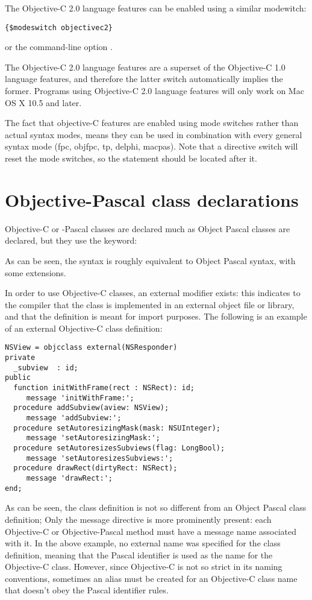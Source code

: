 The Objective-C 2.0 language features can be enabled using a similar
modewitch:
\begin{verbatim}
{$modeswitch objectivec2}
\end{verbatim}
or the command-line option .

The Objective-C 2.0 language features are a superset of the Objective-C 1.0
language features, and therefore the latter switch automatically implies the
former. Programs using Objective-C 2.0 language features will only work on
Mac OS X 10.5 and later.

The fact that objective-C features are enabled using mode switches rather than
actual syntax modes, means they can be used in combination with every general
syntax mode (fpc, objfpc, tp, delphi, macpas). Note that a 
directive switch will reset the mode switches, so the 
statement should be located after it.

\section{Objective-Pascal class declarations}
Objective-C or -Pascal classes are declared much as Object Pascal classes are
declared, but they use the  keyword:

As can be seen, the syntax is roughly equivalent to Object Pascal syntax, with some
extensions.

In order to use Objective-C classes, an external modifier exists: this
indicates to the compiler that the class is implemented in an external object
file or library, and that the definition is meant for import purposes.
The following is an example of an external Objective-C class definition:
\begin{verbatim}
NSView = objcclass external(NSResponder)
private
  _subview  : id;
public
  function initWithFrame(rect : NSRect): id;
     message 'initWithFrame:';
  procedure addSubview(aview: NSView);
     message 'addSubview:';
  procedure setAutoresizingMask(mask: NSUInteger);
     message 'setAutoresizingMask:';
  procedure setAutoresizesSubviews(flag: LongBool);
     message 'setAutoresizesSubviews:';
  procedure drawRect(dirtyRect: NSRect);
     message 'drawRect:';
end;
\end{verbatim}
As can be seen, the class definition is not so different from an Object
Pascal class definition; Only the message directive is more prominently
present: each Objective-C or Objective-Pascal method must have a message
name associated with it. In the above example, no external name was
specified for the class definition, meaning that the Pascal identifier is
used as the name for the Objective-C class. However, since Objective-C is not so
strict in its naming conventions, sometimes an alias must be created for an
Objective-C class name that doesn't obey the Pascal identifier rules.

